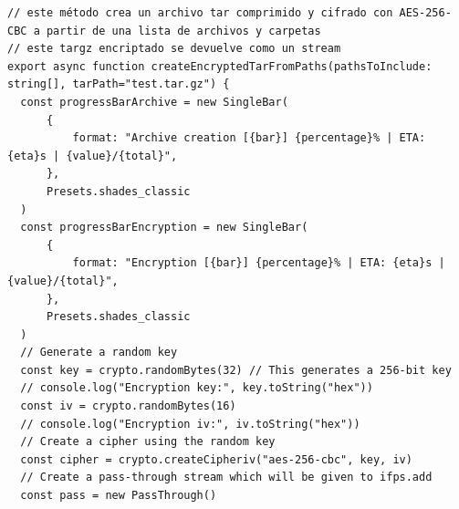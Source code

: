 \begin{verbatim}
// este método crea un archivo tar comprimido y cifrado con AES-256-CBC a partir de una lista de archivos y carpetas
// este targz encriptado se devuelve como un stream
export async function createEncryptedTarFromPaths(pathsToInclude: string[], tarPath="test.tar.gz") {
  const progressBarArchive = new SingleBar(
      {
          format: "Archive creation [{bar}] {percentage}% | ETA: {eta}s | {value}/{total}",
      },
      Presets.shades_classic
  )
  const progressBarEncryption = new SingleBar(
      {
          format: "Encryption [{bar}] {percentage}% | ETA: {eta}s | {value}/{total}",
      },
      Presets.shades_classic
  )
  // Generate a random key
  const key = crypto.randomBytes(32) // This generates a 256-bit key
  // console.log("Encryption key:", key.toString("hex"))
  const iv = crypto.randomBytes(16)
  // console.log("Encryption iv:", iv.toString("hex"))
  // Create a cipher using the random key
  const cipher = crypto.createCipheriv("aes-256-cbc", key, iv) 
  // Create a pass-through stream which will be given to ifps.add
  const pass = new PassThrough()


\end{verbatim}
